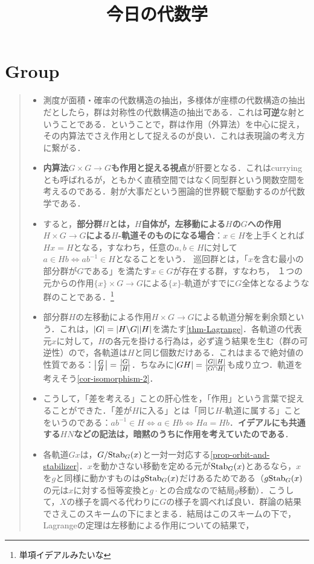 \documentclass[uplatex,dvipdfmx]{jsreport}
\title{今日の代数学}
\author{}
\begin{document}
\tableofcontents

\chapter{Group}

\begin{quotation}\mbox{}
    \begin{itemize}
        \item 測度が面積・確率の代数構造の抽出，多様体が座標の代数構造の抽出だとしたら，群は対称性の代数構造の抽出である．これは\textbf{可逆}な射ということである．ということで，群は作用（外算法）を中心に捉え，その内算法でさえ作用として捉えるのが良い．これは表現論の考え方に繋がる．
        \item \textbf{内算法$G\times G\to G$も作用と捉える視点}が肝要となる．これはcurryingとも呼ばれるが，ともかく直積空間ではなく同型群という関数空間を考えるのである．射が大事だという圏論的世界観で駆動するのが代数学である．
        \item すると，\textbf{部分群$H$とは，$H$自体が，左移動による$H$の$G$への作用$H\times G\to G$による$H$-軌道そのものになる場合}：$x\in H$を上手くとれば$Hx=H$となる，すなわち，任意の$a,b\in H$に対して$a\in Hb\Leftrightarrow ab^{-1}\in H$となることをいう．
        巡回群とは，「$x$を含む最小の部分群が$G$である」を満たす$x\in G$が存在する群，すなわち，
        １つの元からの作用$\{x\}\times G\to G$による$\{x\}$-軌道がすでに$G$全体となるような群のことである．\footnote{単項イデアルみたいな}
        \item 部分群$H$の左移動による作用$H\times G\to G$による軌道分解を剰余類という．これは，$\lvert G\rvert=\lvert H\backslash G\rvert\lvert H\rvert$を満たす\ref{thm-Lagrange}．各軌道の代表元$x$に対して，$H$の各元を掛ける行為は，必ず違う結果を生む（群の可逆性）ので，各軌道は$H$と同じ個数だけある．これはまるで絶対値の性質である：$\left|\frac{G}{H}\right|=\frac{\lvert G\rvert}{\lvert H\rvert}$．ちなみに$\lvert GH\rvert=\frac{\lvert G\rvert\lvert H\rvert}{\lvert G\cap H\rvert}$も成り立つ．軌道を考えそう\ref{cor-isomorphism-2}．
        \item こうして，「差を考える」ことの肝心性を，「作用」という言葉で捉えることができた．「差が$H$に入る」とは「同じ$H$-軌道に属する」ことをいうのである：$ab^{-1}\in H\Leftrightarrow a\in Hb\Leftrightarrow Ha=Hb$．\textbf{イデアルにも共通する$HN$などの記法は，暗黙のうちに作用を考えていたのである}．
        \item 各軌道$Gx$は，$G/\mathrm{Stab}_G(x)$と一対一対応する\ref{prop-orbit-and-stabilizer}．$x$を動かさない移動を定める元が$\mathrm{Stab}_G(x)$とあるなら，$x$を$g$と同様に動かすものは$g\mathrm{Stab}_G(x)$だけあるためである（$g\mathrm{Stab}_G(x)$の元は$x$に対する恒等変換と$g\cdot$との合成なので結局$g$移動）．こうして，$X$の様子を調べる代わりに$G$の様子を調べれば良い．群論の結果でさえこのスキームの下にまとまる．結局はこのスキームの下で，Lagrangeの定理は左移動による作用についての結果で，

\end{itemize}
\end{quotation}
\end{document}
